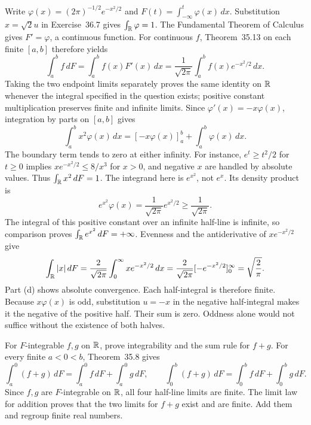 Write $\varphi(x)=(2\pi)^{-1/2}e^{-x^2/2}$ and
$F(t)=\int_{-\infty}^t\varphi(x)\,dx$. Substitution
$x=\sqrt2u$ in Exercise~36.7 gives $\int_{\mathbb{R}}\varphi=1$.
The Fundamental Theorem of Calculus gives $F'=\varphi$, a continuous
function. For continuous $f$, Theorem~35.13 on each finite $[a,b]$
therefore yields
\[
 \int_a^b f\,dF=\int_a^b f(x)F'(x)\,dx
 =\frac1{\sqrt{2\pi}}\int_a^b f(x)e^{-x^2/2}\,dx.
\]
Taking the two endpoint limits separately proves the same identity
on $\mathbb{R}$ whenever the integral specified in the question exists;
positive constant multiplication preserves finite and infinite limits.
Since $\varphi'(x)=-x\varphi(x)$, integration by parts on $[a,b]$ gives
\[
 \int_a^b x^2\varphi(x)\,dx
 =[-x\varphi(x)]_a^b+\int_a^b\varphi(x)\,dx.
\]
The boundary term tends to zero at either infinity. For instance,
$e^t\geq t^2/2$ for $t\geq0$ implies
$xe^{-x^2/2}\leq8/x^3$ for $x>0$, and negative $x$ are handled
by absolute values. Thus $\int_{\mathbb{R}} x^2\,dF=1$.
The integrand here is $e^{x^2}$, not $e^x$. Its density product is
\[
 e^{x^2}\varphi(x)=\frac1{\sqrt{2\pi}}e^{x^2/2}
 \geq\frac1{\sqrt{2\pi}}.
\]
The integral of this positive constant over an infinite half-line
is infinite, so comparison proves $\int_{\mathbb{R}} e^{x^2}\,dF=+\infty$.
Evenness and the antiderivative of $x e^{-x^2/2}$ give
\[
 \int_{\mathbb{R}} |x|\,dF
 =\frac2{\sqrt{2\pi}}\int_0^\infty x e^{-x^2/2}\,dx
 =\frac2{\sqrt{2\pi}}[-e^{-x^2/2}]_0^\infty
 =\sqrt{\frac2\pi}.
\]
Part (d) shows absolute convergence. Each half-integral is therefore
finite. Because $x\varphi(x)$ is odd, substitution $u=-x$ in the
negative half-integral makes it the negative of the positive half.
Their sum is zero. Oddness alone would not suffice without the
existence of both halves.

\goal For $F$-integrable $f,g$ on $\mathbb{R}$, prove integrability and
the sum rule for $f+g$.
For every finite $a<0<b$, Theorem~35.8 gives
\[
 \int_a^0(f+g)\,dF=\int_a^0 f\,dF+\int_a^0 g\,dF,
 \qquad
 \int_0^b(f+g)\,dF=\int_0^b f\,dF+\int_0^b g\,dF.
\]
Since $f,g$ are $F$-integrable on $\mathbb{R}$, all four half-line limits
are finite. The limit law for addition proves that the two limits
for $f+g$ exist and are finite. Add them and regroup finite real numbers.

